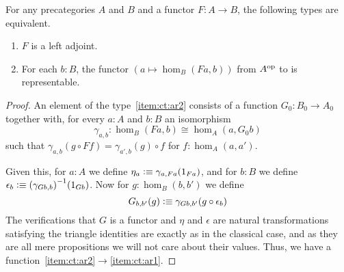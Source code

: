 \begin{lem}\label{ct:adj-repr}
  For any precategories $A$ and $B$ and a functor $F:A\to B$, the following types are equivalent.
  \begin{enumerate}
  \item $F$ is a left adjoint.\label{item:ct:ar1}
  \item For each $b:B$, the functor $(a \mapsto \hom_B(Fa,b))$ from $A^{\textrm{op}}$ to \uset is representable.\label{item:ct:ar2}
  \end{enumerate}
\end{lem}
\begin{proof}
  An element of the type~\ref{item:ct:ar2} consists of a function $G_0:B_0 \to A_0$ together with, for every $a:A$ and $b:B$ an isomorphism
  \[ \gamma_{a,b}:\hom_B(Fa,b) \cong \hom_A(a,G_0 b) \]
  such that $\gamma_{a,b}(g \circ Ff) = \gamma_{a',b}(g)\circ f$ for $f:\hom_{A}(a,a')$.
  
  Given this, for $a:A$ we define $\eta_a \vcentcolon\equiv \gamma_{a,Fa}(1_{Fa})$, and for $b:B$ we define $\epsilon_b \vcentcolon\equiv {(\gamma_{Gb,b})}^{-1}(1_{Gb})$.
  Now for $g:\hom_B(b,b')$ we define
  \[ G_{b,b'}(g) \vcentcolon\equiv \gamma_{G b, b'}(g \circ \epsilon_b) \]
  The verifications that $G$ is a functor and $\eta$ and $\epsilon$ are natural transformations satisfying the triangle identities are exactly as in the classical case, and as they are all mere propositions we will not care about their values.
  Thus, we have a function~\ref{item:ct:ar2}$\to$\ref{item:ct:ar1}.


\end{proof}
